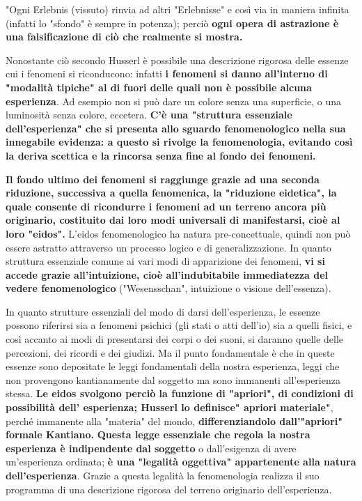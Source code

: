 "Ogni Erlebnis (vissuto) rinvia ad altri "Erlebnisse"
e così via in maniera infinita (infatti lo "sfondo" è
sempre in potenza); perciò \textbf{ogni opera di
astrazione è una falsificazione di ciò che
realmente si mostra.}

Nonostante ciò secondo Husserl è possibile
una descrizione rigorosa delle essenze cui
i fenomeni si riconducono: infatti \textbf{i fenomeni
si danno all'interno di "modalità tipiche"
al di fuori delle quali non è possibile alcuna
esperienza}. Ad esempio non si può dare un
colore senza una superficie, o una luminosità senza colore, eccetera. \textbf{C'è una "struttura
essenziale dell'esperienza" che si presenta allo
sguardo fenomenologico nella sua innegabile
evidenza: a questo si rivolge la fenomenologia, evitando così la deriva scettica e la
rincorsa senza fine al fondo dei fenomeni.}

\textbf{Il fondo ultimo dei fenomeni si raggiunge
grazie ad una seconda riduzione, successiva a
quella fenomenica, la "riduzione eidetica",
la quale consente di ricondurre i fenomeni
ad un terreno ancora più originario,
costituito dai loro modi universali di
manifestarsi, cioè al loro "eidos".}
L'eidos fenomenologico ha natura pre-concettuale,
quindi non può essere astratto attraverso un processo
logico e di generalizzazione. In quanto struttura
essenziale comune ai vari modi di apparizione dei
fenomeni, \textbf{vi si accede grazie all'intuizione, cioè
all'indubitabile immediatezza del vedere
fenomenologico} ("Wesensschan", intuizione o
visione dell'essenza).

In quanto strutture essenziali del modo di darsi
dell'esperienza, le essenze possono riferirsi
sia a fenomeni psichici (gli stati o atti dell'io)
sia a quelli fisici, e così accanto ai modi di
presentarsi dei corpi o dei suoni, si daranno quelle
delle percezioni, dei ricordi e dei giudizi.
Ma il punto fondamentale è che in queste
essenze sono depositate le leggi fondamentali
della nostra esperienza, leggi che non
provengono kantianamente dal soggetto ma sono
immanenti all'esperienza stessa. \textbf{Le eidos
svolgono perciò la funzione di "apriori", di
condizioni di possibilità dell' esperienza;
Husserl lo definisce" apriori materiale"}, perché
immanente alla "materia" del mondo, \textbf{differenziandolo dall'"apriori" formale Kantiano.}
\textbf{Questa legge essenziale che regola la nostra
esperienza è indipendente dal soggetto }o dall'esigenza di avere un'esperienza ordinata;
\textbf{è una "legalità oggettiva" appartenente alla
natura dell'esperienza}. Grazie a questa
legalità la fenomenologia realizza il suo
programma di una descrizione rigorosa
del terreno originario dell'esperienza.

